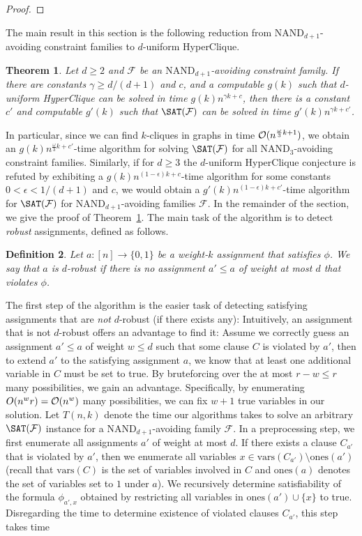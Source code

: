 \documentclass[10pt,a4paper]{article}
\theoremstyle{plain}
\newtheorem{thm}{Theorem}[section]
\newtheorem{defn}[thm]{Definition}
\newcommand{\Oh}{{\cal O}}
\newcommand{\NAND}{\mathrm{NAND}}
\newcommand{\confam}{\mathcal{F}}
\newcommand{\vars}{\mathrm{vars}}
\newcommand{\ones}{\mathrm{ones}}
\newcommand{\eps}{\epsilon}
\begin{document}
\begin{proof}
\end{proof}
%
The main result in this section is the following reduction from $\NAND_{d+1}$-avoiding constraint families to $d$-uniform HyperClique.
%
\begin{thm}\label{thm:NANDavoidingalgo}
Let $d\ge 2$ and $\confam$ be an $\NAND_{d+1}$-avoiding constraint family. If there are constants $\gamma \ge d/(d+1)$ and $c$, and a computable $g(k)$ such that $d$-uniform HyperClique can be solved in time $g(k) n^{\gamma k + c}$, then there is a constant $c'$ and computable $g'(k)$ such that $\SAT(\confam)$ can be solved in time $g'(k) n^{\gamma k + c'}$.
\end{thm}
In particular, since we can find $k$-cliques in graphs in time $\Oh(n^{\frac{\omega}{3}k + 1})$, we obtain an $g(k) n^{\frac{\omega}{3}k + c'}$-time algorithm for solving $\SAT(\confam)$ for all $\NAND_3$-avoiding constraint families. Similarly, if for $d\ge 3$ the $d$-uniform HyperClique conjecture is refuted by exhibiting a $g(k)n^{(1-\eps)k+c}$-time algorithm for some constants $0< \eps < 1/(d+1)$ and $c$, we would obtain a $g'(k) n^{(1-\eps)k+c'}$-time algorithm for $\SAT(\confam)$ for $\NAND_{d+1}$-avoiding families $\confam$.
%
In the remainder of the section, we give the proof of Theorem~\ref{thm:NANDavoidingalgo}. 
The main task of the algorithm is to detect \emph{robust} assignments, defined as follows.
%
\begin{defn}
Let $a: [n] \to \{0,1\}$ be a weight-$k$ assignment that satisfies $\phi$. We say that $a$ is \emph{$d$-robust} if there is no assignment $a' \le a$ of weight at most $d$ that violates $\phi$.
\end{defn}
%
The first step of the algorithm is the easier task of detecting satisfying assignments that are \emph{not} $d$-robust (if there exists any):
Intuitively, an assignment that is not $d$-robust offers an advantage to find it: Assume we correctly guess an assignment $a'\le a$ of weight $w \le d$ such that some clause $C$ is violated by $a'$, then to extend $a'$ to the satisfying assignment $a$, we know that at least one additional variable in $C$ must be set to true. By bruteforcing over the at most $r-w \le r$ many possibilities, we gain an advantage. Specifically, by enumerating $O(n^{w}r) = \Oh(n^{w})$ many possibilities, we can fix $w+1$ true variables in our solution.
%
Let $T(n,k)$ denote the time our algorithms takes to solve an arbitrary $\SAT(\confam)$ instance for a $\NAND_{d+1}$-avoiding family $\confam$. 
In a preprocessing step, we first enumerate all assignments $a'$ of weight at most $d$. If there exists a clause $C_{a'}$ that is violated by $a'$, then we enumerate all variables $x \in \vars(C_{a'})\setminus \ones(a')$ (recall that $\vars(C)$ is the set of variables involved in $C$ and $\ones(a)$ denotes the set of variables set to $1$ under $a$). We recursively determine satisfiability of the formula $\phi_{a',x}$ obtained by restricting all variables in $\ones(a') \cup \{x\}$ to true. Disregarding the time to determine existence of violated clauses $C_{a'}$, this step takes time 
\end{document}
